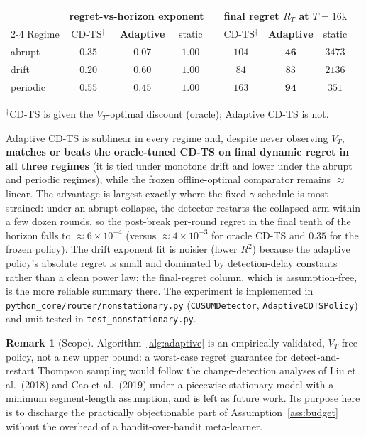 \documentclass[11pt]{article}
\theoremstyle{definition}
\newtheorem{remark}{Remark}
\begin{document}
\begin{center}
\begin{tabular}{l ccc c ccc}
\hline
 & \multicolumn{3}{c}{regret-vs-horizon exponent} & & \multicolumn{3}{c}{final regret $R_T$ at $T{=}16\mathrm{k}$} \\
\cline{2-4}\cline{6-8}
Regime & CD-TS$^\dagger$ & \textbf{Adaptive} & static & & CD-TS$^\dagger$ & \textbf{Adaptive} & static \\
\hline
abrupt   & $0.35$ & $\mathbf{0.07}$ & $1.00$ & & $104$ & $\mathbf{46}$  & $3473$ \\
drift    & $0.20$ & $0.60$ & $1.00$ & & $84$  & $83$  & $2136$ \\
periodic & $0.55$ & $\mathbf{0.45}$ & $1.00$ & & $163$ & $\mathbf{94}$  & $351$ \\
\hline
\end{tabular}
\end{center}
{\small $^\dagger$CD-TS is given the $V_T$-optimal discount (oracle); Adaptive CD-TS is not.}

Adaptive CD-TS is sublinear in every regime and, despite never observing $V_T$,
\textbf{matches or beats the oracle-tuned CD-TS on final dynamic regret in all
three regimes} (it is tied under monotone drift and lower under the abrupt and
periodic regimes), while the frozen offline-optimal comparator remains
$\approx$ linear. The advantage is largest exactly where the fixed-$\gamma$
schedule is most strained: under an abrupt collapse, the detector restarts the
collapsed arm within a few dozen rounds, so the post-break per-round regret in
the final tenth of the horizon falls to $\approx 6\times 10^{-4}$ (versus
$\approx 4\times 10^{-3}$ for oracle CD-TS and $0.35$ for the frozen policy).
The drift exponent fit is noisier (lower $R^2$) because the adaptive policy's
absolute regret is small and dominated by detection-delay constants rather than
a clean power law; the final-regret column, which is assumption-free, is the
more reliable summary there. The experiment is implemented in
\texttt{python\_core/router/nonstationary.py}
(\texttt{CUSUMDetector}, \texttt{AdaptiveCDTSPolicy}) and unit-tested in
\texttt{test\_nonstationary.py}.

\begin{remark}[Scope]
Algorithm~\ref{alg:adaptive} is an empirically validated, $V_T$-free policy, not
a new upper bound: a worst-case regret guarantee for detect-and-restart Thompson
sampling would follow the change-detection analyses of Liu et al.\ (2018) and
Cao et al.\ (2019) under a piecewise-stationary model with a minimum
segment-length assumption, and is left as future work. Its purpose here is to
discharge the practically objectionable part of Assumption~\ref{ass:budget}
without the overhead of a bandit-over-bandit meta-learner.
\end{remark}
\end{document}
